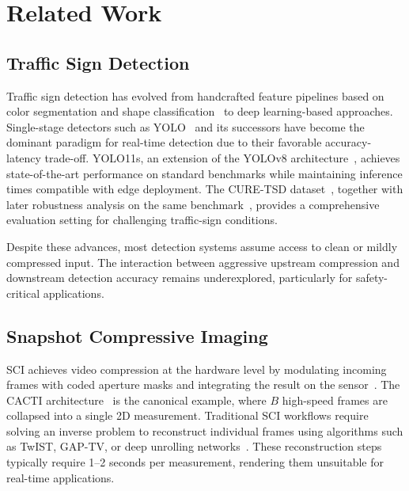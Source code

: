 \documentclass[10pt,journal]{IEEEtran}
\begin{document}

\section{Related Work}

\subsection{Traffic Sign Detection}

Traffic sign detection has evolved from handcrafted feature pipelines based on color segmentation and shape classification~\cite{stallkamp2012gtsrb} to deep learning-based approaches. Single-stage detectors such as YOLO~\cite{redmon2016yolo} and its successors have become the dominant paradigm for real-time detection due to their favorable accuracy-latency trade-off. YOLO11s, an extension of the YOLOv8 architecture~\cite{jocher2023yolov8}, achieves state-of-the-art performance on standard benchmarks while maintaining inference times compatible with edge deployment. The CURE-TSD dataset~\cite{temel2017curetsd}, together with later robustness analysis on the same benchmark~\cite{temel2020tits}, provides a comprehensive evaluation setting for challenging traffic-sign conditions.

Despite these advances, most detection systems assume access to clean or mildly compressed input. The interaction between aggressive upstream compression and downstream detection accuracy remains underexplored, particularly for safety-critical applications.

\subsection{Snapshot Compressive Imaging}

SCI achieves video compression at the hardware level by modulating incoming frames with coded aperture masks and integrating the result on the sensor~\cite{yuan2021sci}. The CACTI architecture~\cite{liu2019cacti} is the canonical example, where $B$ high-speed frames are collapsed into a single 2D measurement. Traditional SCI workflows require solving an inverse problem to reconstruct individual frames using algorithms such as TwIST, GAP-TV, or deep unrolling networks~\cite{ma2019deep}. These reconstruction steps typically require 1--2 seconds per measurement, rendering them unsuitable for real-time applications.
\end{document}
